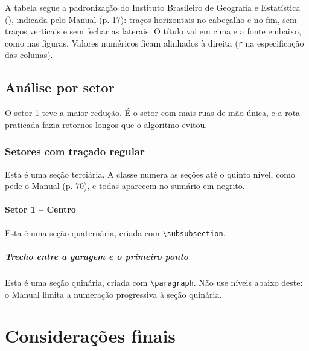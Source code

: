 \documentclass[tcc,capa]{texufpel}
\begin{document}
A tabela segue a padronização do Instituto Brasileiro de Geografia e
Estatística (),
indicada pelo Manual (p. 17): traços
horizontais no cabeçalho e no fim, sem traços verticais e sem fechar as
laterais. O título vai em cima e a fonte embaixo, como nas figuras. Valores
numéricos ficam alinhados à direita (\texttt{r} na especificação das
colunas).

\section{Análise por setor}

O setor 1 teve a maior redução. É o setor com mais ruas de mão única, e a rota
praticada fazia retornos longos que o algoritmo evitou.

\subsection{Setores com traçado regular}

Esta é uma seção terciária. A classe numera as seções até o quinto nível,
como pede o Manual (p. 70), e todas aparecem no sumário em negrito.

\subsubsection{Setor 1 -- Centro}

Esta é uma seção quaternária, criada com \verb|\subsubsection|.

\paragraph{Trecho entre a garagem e o primeiro ponto}

Esta é uma seção quinária, criada com \verb|\paragraph|. Não use níveis abaixo
deste: o Manual limita a numeração progressiva à seção quinária.

\chapter{Considerações finais}
\label{cap:consideracoes}
\end{document}
